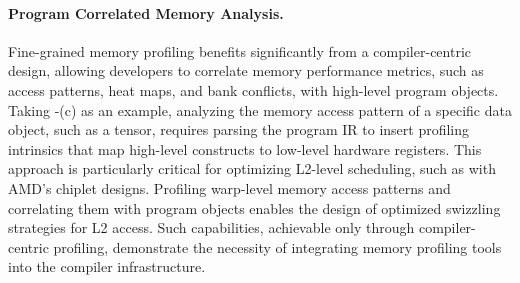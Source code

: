 \paragraph{Program Correlated Memory Analysis.}
Fine-grained memory profiling benefits significantly from a compiler-centric design, allowing developers to correlate memory performance metrics, such as access patterns, heat maps, and bank conflicts, with high-level program objects. 
Taking \Fig{\ref{fig:compiler_centric_example}}-(c) as an example, analyzing the memory access pattern of a specific data object, such as a tensor, requires parsing the program IR to insert profiling intrinsics that map high-level constructs to low-level hardware registers. This approach is particularly critical for optimizing L2-level scheduling, such as with AMD’s chiplet designs\cite{cnda_whitepaper}. 
Profiling warp-level memory access patterns and correlating them with program objects enables the design of optimized swizzling strategies for L2 access. 
Such capabilities, achievable only through compiler-centric profiling, demonstrate the necessity of integrating memory profiling tools into the compiler infrastructure.
